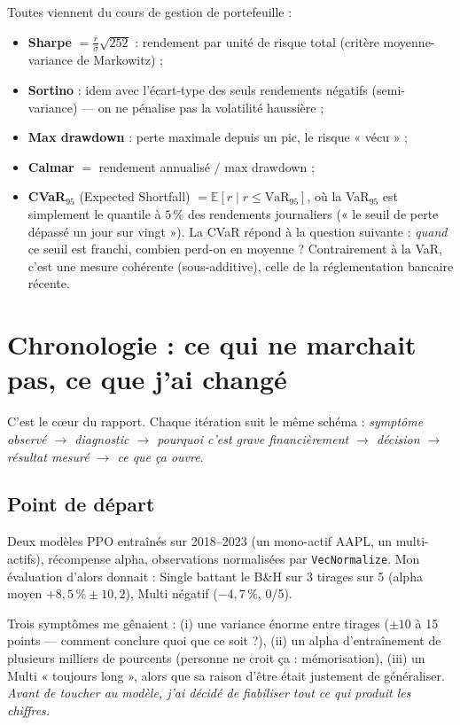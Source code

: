 \documentclass[11pt,a4paper]{article}
\newcommand{\code}[1]{\texttt{#1}}
\begin{document}
Toutes viennent du cours de gestion de portefeuille :
\begin{itemize}[itemsep=2pt]
  \item \textbf{Sharpe} $= \frac{\bar{r}}{\hat\sigma}\sqrt{252}$ : rendement par unité de
        risque total (critère moyenne-variance de Markowitz) ;
  \item \textbf{Sortino} : idem avec l'écart-type des seuls rendements négatifs
        (semi-variance) --- on ne pénalise pas la volatilité haussière ;
  \item \textbf{Max drawdown} : perte maximale depuis un pic, le risque « vécu » ;
  \item \textbf{Calmar} $=$ rendement annualisé $/$ max drawdown ;
  \item \textbf{CVaR$_{95}$} (Expected Shortfall)
        $= \mathbb{E}[r \mid r \le \text{VaR}_{95}]$, où la VaR$_{95}$ est simplement le
        quantile à $5\,\%$ des rendements journaliers (« le seuil de perte dépassé un
        jour sur vingt »). La CVaR répond à la question suivante : \emph{quand} ce seuil
        est franchi, combien perd-on en moyenne ? Contrairement à la VaR, c'est une
        mesure cohérente (sous-additive), celle de la réglementation bancaire récente.
\end{itemize}

\section{Chronologie : ce qui ne marchait pas, ce que j'ai changé}
\label{sec:evolution}

C'est le c\oe ur du rapport. Chaque itération suit le même schéma : \emph{symptôme
observé $\to$ diagnostic $\to$ pourquoi c'est grave financièrement $\to$ décision $\to$
résultat mesuré $\to$ ce que ça ouvre}.

\subsection{Point de départ}

Deux modèles PPO entraînés sur 2018--2023 (un mono-actif AAPL, un multi-actifs),
récompense alpha, observations normalisées par \code{VecNormalize}. Mon évaluation
d'alors donnait : Single battant le B\&H sur 3 tirages sur 5 (alpha moyen
$+8{,}5\,\% \pm 10{,}2$), Multi négatif ($-4{,}7\,\%$, 0/5).

Trois symptômes me gênaient : (i) une variance énorme entre tirages ($\pm 10$ à
15 points --- comment conclure quoi que ce soit ?), (ii) un alpha d'entraînement de
plusieurs milliers de pourcents (personne ne croit ça : mémorisation), (iii) un Multi
« toujours long », alors que sa raison d'être était justement de généraliser.
\emph{Avant de toucher au modèle, j'ai décidé de fiabiliser tout ce qui produit les
chiffres.}
\end{document}
